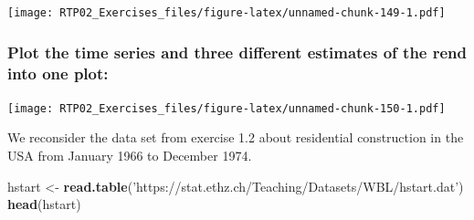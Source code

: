 \documentclass[
]{article}
\newenvironment{Shaded}{\begin{snugshade}}{\end{snugshade}}
\newcommand{\DataTypeTok}[1]{\textcolor[rgb]{0.13,0.29,0.53}{#1}}
\newcommand{\DecValTok}[1]{\textcolor[rgb]{0.00,0.00,0.81}{#1}}
\newcommand{\KeywordTok}[1]{\textcolor[rgb]{0.13,0.29,0.53}{\textbf{#1}}}
\newcommand{\NormalTok}[1]{#1}
\newcommand{\OperatorTok}[1]{\textcolor[rgb]{0.81,0.36,0.00}{\textbf{#1}}}
\newcommand{\StringTok}[1]{\textcolor[rgb]{0.31,0.60,0.02}{#1}}
\begin{document}
\texttt{[image: RTP02\_Exercises\_files/figure-latex/unnamed-chunk-149-1.pdf]}

\hypertarget{plot-the-time-series-and-three-different-estimates-of-the-rend-into-one-plot}{%
\subsubsection{Plot the time series and three different estimates of the
rend into one
plot:}\label{plot-the-time-series-and-three-different-estimates-of-the-rend-into-one-plot}}

\begin{Shaded}
\end{Shaded}

\texttt{[image: RTP02\_Exercises\_files/figure-latex/unnamed-chunk-150-1.pdf]}

We reconsider the data set from exercise 1.2 about residential
construction in the USA from January 1966 to December 1974.

\begin{Shaded}
\begin{Highlighting}[]
\NormalTok{hstart <-}\StringTok{ }\KeywordTok{read.table}\NormalTok{(}\StringTok{'https://stat.ethz.ch/Teaching/Datasets/WBL/hstart.dat'}\NormalTok{)}
\KeywordTok{head}\NormalTok{(hstart)}
\end{Highlighting}
\end{Shaded}
\end{document}
